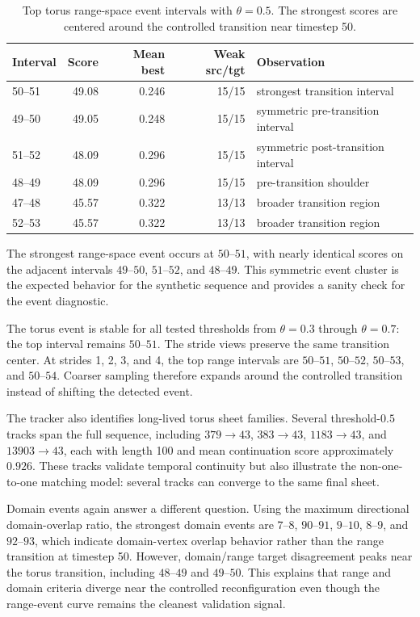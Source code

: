 \documentclass{vgtc}
\begin{document}
\begin{table}[t]
  \centering
  \caption{Top torus range-space event intervals with $\theta=0.5$. The strongest scores are centered around the controlled transition near timestep 50.}
  \label{tab:torus-events}
  \begin{tabular}{lrrrl}
    \toprule
    Interval & Score & Mean best & Weak src/tgt & Observation \\
    \midrule
    50--51 & 49.08 & 0.246 & 15/15 & strongest transition interval \\
    49--50 & 49.05 & 0.248 & 15/15 & symmetric pre-transition interval \\
    51--52 & 48.09 & 0.296 & 15/15 & symmetric post-transition interval \\
    48--49 & 48.09 & 0.296 & 15/15 & pre-transition shoulder \\
    47--48 & 45.57 & 0.322 & 13/13 & broader transition region \\
    52--53 & 45.57 & 0.322 & 13/13 & broader transition region \\
    \bottomrule
  \end{tabular}
\end{table}

The strongest range-space event occurs at $50$--$51$, with nearly identical scores on the adjacent intervals $49$--$50$, $51$--$52$, and $48$--$49$. This symmetric event cluster is the expected behavior for the synthetic sequence and provides a sanity check for the event diagnostic.

The torus event is stable for all tested thresholds from $\theta=0.3$ through $\theta=0.7$: the top interval remains $50$--$51$. The stride views preserve the same transition center. At strides 1, 2, 3, and 4, the top range intervals are $50$--$51$, $50$--$52$, $50$--$53$, and $50$--$54$. Coarser sampling therefore expands around the controlled transition instead of shifting the detected event.

The tracker also identifies long-lived torus sheet families. Several threshold-$0.5$ tracks span the full sequence, including $379\rightarrow43$, $383\rightarrow43$, $1183\rightarrow43$, and $13903\rightarrow43$, each with length 100 and mean continuation score approximately $0.926$. These tracks validate temporal continuity but also illustrate the non-one-to-one matching model: several tracks can converge to the same final sheet.

Domain events again answer a different question. Using the maximum directional domain-overlap ratio, the strongest domain events are $7$--$8$, $90$--$91$, $9$--$10$, $8$--$9$, and $92$--$93$, which indicate domain-vertex overlap behavior rather than the range transition at timestep 50. However, domain/range target disagreement peaks near the torus transition, including $48$--$49$ and $49$--$50$. This explains that range and domain criteria diverge near the controlled reconfiguration even though the range-event curve remains the cleanest validation signal.
\end{document}
